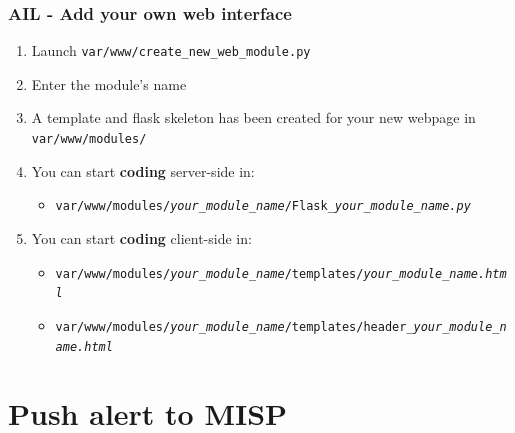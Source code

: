 \begin{frame}
    \frametitle{AIL - Add your own web interface}
    \begin{enumerate}
        \item Launch \texttt{var/www/create\_new\_web\_module.py}
        \item Enter the module's name
        \item A template and flask skeleton has been created for your new webpage in \texttt{var/www/modules/}
        \item You can start \textbf{coding} server-side in:
            \begin{itemize}
                \item[] {\scriptsize \texttt{var/www/modules/\textit{your\_module\_name}/Flask\_\textit{your\_module\_name.py}}}
            \end{itemize}
        \item You can start \textbf{coding} client-side in:
            \begin{itemize}
                \item[] {\scriptsize \texttt{var/www/modules/\textit{your\_module\_name}/templates/\textit{your\_module\_name.html}}}
                \item[] {\scriptsize \texttt{var/www/modules/\textit{your\_module\_name}/templates/header\_\textit{your\_module\_name.html}}}
            \end{itemize}
    \end{enumerate}
\end{frame}

\section{Push alert to MISP}

